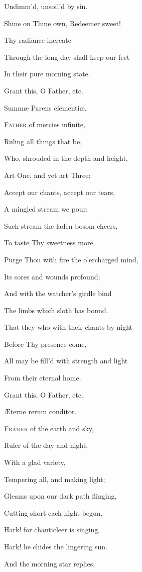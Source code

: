 Undimm'd, unsoil'd by sin.

Shine on Thine own, Redeemer sweet!

Thy radiance increate

Through the long day shall keep our feet

In their pure morning state.

Grant this, O Father, etc.


Summæ Parens clementiæ.

F\textsc{ather} of mercies infinite,

Ruling all things that be,

Who, shrouded in the depth and height,

Art One, and yet art Three;

Accept our chants, accept our tears,

A mingled stream we pour;

Such stream the laden bosom cheers,

To taste Thy sweetness more.

Purge Thou with fire the o'ercharged mind,

Its sores and wounds profound;

And with the watcher's girdle bind

The limbs which sloth has bound. 

That they who with their chants by night

Before Thy presence come,

All may be fill'd with strength and light

From their eternal home.

Grant this, O Father, etc.


Æterne rerum conditor.

F\textsc{ramer} of the earth and sky,

Ruler of the day and night,

With a glad variety,

Tempering all, and making light;

Gleams upon our dark path flinging,

Cutting short each night begun,

Hark! for chanticleer is singing,

Hark! he chides the lingering sun.

And the morning star replies,


